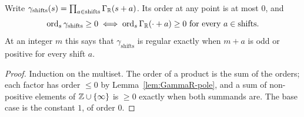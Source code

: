 \begin{lemma}
  \label{lem:prodGammaR}
  \leanok
  Write $\gamma_{\mathrm{shifts}}(s) = \prod_{a \in \mathrm{shifts}} \Gamma_{\mathbb{R}}(s+a)$. Its
  order at any point is at most $0$, and
  \[ \operatorname{ord}_{s}\gamma_{\mathrm{shifts}} \geq 0
     \iff \operatorname{ord}_{s}\Gamma_{\mathbb{R}}(\cdot + a) \geq 0 \text{ for every }
       a \in \mathrm{shifts}. \]
  At an integer $m$ this says that $\gamma_{\mathrm{shifts}}$ is regular exactly when $m+a$ is odd
  or positive for every shift $a$.
\end{lemma}
\begin{proof}
  \leanok
  Induction on the multiset. The order of a product is the sum of the orders; each factor has
  order $\leq 0$ by Lemma~\ref{lem:GammaR-pole}, and a sum of non-positive elements of
  $\mathbb{Z} \cup \{\infty\}$ is $\geq 0$ exactly when both summands are. The base case is the constant
  $1$, of order $0$.
\end{proof}

